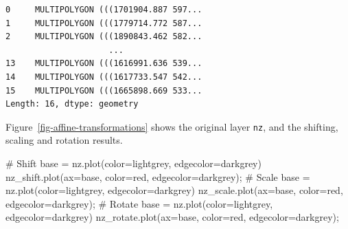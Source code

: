 \documentclass[
  letterpaper,
]{krantz}
\newenvironment{Shaded}{\begin{snugshade}}{\end{snugshade}}
\newcommand{\CommentTok}[1]{\textcolor[rgb]{0.37,0.37,0.37}{#1}}
\newcommand{\NormalTok}[1]{\textcolor[rgb]{0.00,0.23,0.31}{#1}}
\newcommand{\OperatorTok}[1]{\textcolor[rgb]{0.37,0.37,0.37}{#1}}
\newcommand{\StringTok}[1]{\textcolor[rgb]{0.13,0.47,0.30}{#1}}
\begin{document}
\begin{verbatim}
0     MULTIPOLYGON (((1701904.887 597...
1     MULTIPOLYGON (((1779714.772 587...
2     MULTIPOLYGON (((1890843.462 582...
                     ...                
13    MULTIPOLYGON (((1616991.636 539...
14    MULTIPOLYGON (((1617733.547 542...
15    MULTIPOLYGON (((1665898.669 533...
Length: 16, dtype: geometry
\end{verbatim}

Figure~\ref{fig-affine-transformations} shows the original layer
\texttt{nz}, and the shifting, scaling and rotation results.

\begin{Shaded}
\begin{Highlighting}[]
\CommentTok{\# Shift}
\NormalTok{base }\OperatorTok{=}\NormalTok{ nz.plot(color}\OperatorTok{=}\StringTok{\textquotesingle{}lightgrey\textquotesingle{}}\NormalTok{, edgecolor}\OperatorTok{=}\StringTok{\textquotesingle{}darkgrey\textquotesingle{}}\NormalTok{)}
\NormalTok{nz\_shift.plot(ax}\OperatorTok{=}\NormalTok{base, color}\OperatorTok{=}\StringTok{\textquotesingle{}red\textquotesingle{}}\NormalTok{, edgecolor}\OperatorTok{=}\StringTok{\textquotesingle{}darkgrey\textquotesingle{}}\NormalTok{)}\OperatorTok{;}
\CommentTok{\# Scale}
\NormalTok{base }\OperatorTok{=}\NormalTok{ nz.plot(color}\OperatorTok{=}\StringTok{\textquotesingle{}lightgrey\textquotesingle{}}\NormalTok{, edgecolor}\OperatorTok{=}\StringTok{\textquotesingle{}darkgrey\textquotesingle{}}\NormalTok{)}
\NormalTok{nz\_scale.plot(ax}\OperatorTok{=}\NormalTok{base, color}\OperatorTok{=}\StringTok{\textquotesingle{}red\textquotesingle{}}\NormalTok{, edgecolor}\OperatorTok{=}\StringTok{\textquotesingle{}darkgrey\textquotesingle{}}\NormalTok{)}\OperatorTok{;}
\CommentTok{\# Rotate}
\NormalTok{base }\OperatorTok{=}\NormalTok{ nz.plot(color}\OperatorTok{=}\StringTok{\textquotesingle{}lightgrey\textquotesingle{}}\NormalTok{, edgecolor}\OperatorTok{=}\StringTok{\textquotesingle{}darkgrey\textquotesingle{}}\NormalTok{)}
\NormalTok{nz\_rotate.plot(ax}\OperatorTok{=}\NormalTok{base, color}\OperatorTok{=}\StringTok{\textquotesingle{}red\textquotesingle{}}\NormalTok{, edgecolor}\OperatorTok{=}\StringTok{\textquotesingle{}darkgrey\textquotesingle{}}\NormalTok{)}\OperatorTok{;}
\end{Highlighting}
\end{Shaded}
\end{document}
